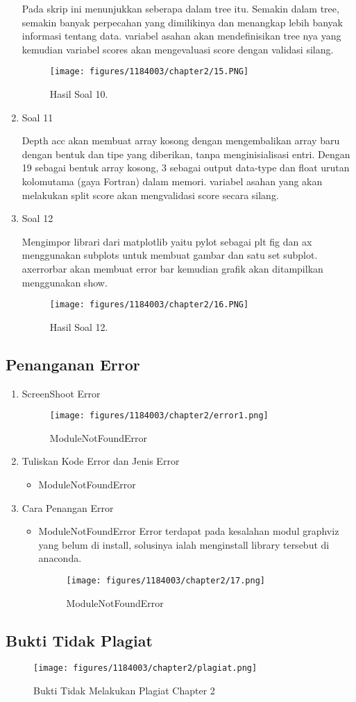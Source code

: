 \begin{enumerate}
	Pada skrip ini menunjukkan seberapa dalam tree itu. Semakin dalam tree, semakin banyak perpecahan yang dimilikinya dan menangkap lebih banyak informasi tentang data. variabel asahan akan mendefinisikan tree nya yang kemudian variabel scores akan mengevaluasi score dengan validasi silang. 
	\begin{figure}[h]
	\centering
		\texttt{[image: figures/1184003/chapter2/15.PNG]}
		\caption{Hasil Soal 10.}
	\end{figure}
\item Soal 11
	\hfill\break
	
	Depth acc akan membuat array kosong dengan mengembalikan array baru dengan bentuk dan tipe yang diberikan, tanpa menginisialisasi entri. Dengan 19 sebagai bentuk array kosong, 3 sebagai output data-type dan float urutan kolomutama (gaya Fortran) dalam memori. variabel asahan yang akan melakukan split score akan mengvalidasi score secara silang. 
	\item Soal 12
	\hfill\break
	
	Mengimpor librari dari matplotlib yaitu pylot sebagai plt fig dan ax menggunakan subplots untuk membuat gambar dan satu set subplot. axerrorbar akan membuat error bar kemudian grafik akan ditampilkan menggunakan show.
	\begin{figure}
	\centering
		\texttt{[image: figures/1184003/chapter2/16.PNG]}
		\caption{Hasil Soal 12.}
	\end{figure}
\end{enumerate}
\newpage\subsection{Penanganan Error}
\begin{enumerate}
	\item ScreenShoot Error
	\begin{figure}[h]
		\texttt{[image: figures/1184003/chapter2/error1.png]}
		\centering
		\caption{ModuleNotFoundError}
	\end{figure}
	\item Tuliskan Kode Error dan Jenis Error
	\begin{itemize}
	
		\item ModuleNotFoundError
	\end{itemize}
	\item Cara Penangan Error
	\begin{itemize}
		\item ModuleNotFoundError
		\hfill\break
		Error terdapat pada kesalahan modul graphviz yang belum di install, solusinya ialah menginstall library tersebut di anaconda.
		\begin{figure}[h]
		\texttt{[image: figures/1184003/chapter2/17.png]}
		\centering
		\caption{ModuleNotFoundError}
	\end{figure}
	\end{itemize}
\end{enumerate}
	\subsection{Bukti Tidak Plagiat}
\begin{figure}[h]
	\texttt{[image: figures/1184003/chapter2/plagiat.png]}
	\centering
	\caption{Bukti Tidak Melakukan Plagiat Chapter 2}
\end{figure}